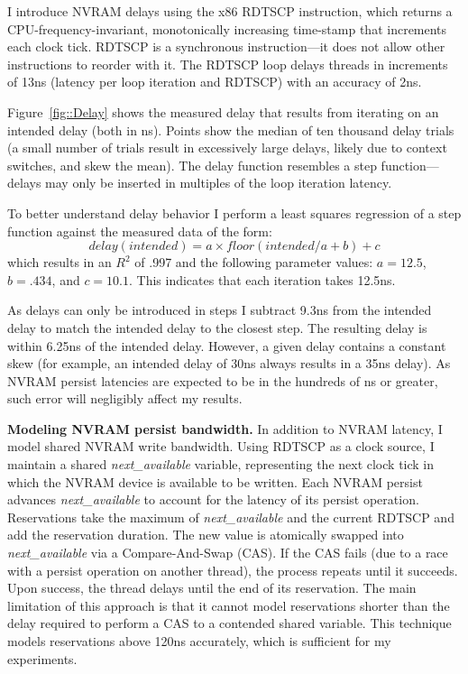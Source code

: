 I introduce NVRAM delays using the x86 RDTSCP instruction, which returns a CPU-frequency-invariant, monotonically increasing time-stamp that increments each clock tick.
RDTSCP is a synchronous instruction---it does not allow other instructions to reorder with it.
The RDTSCP loop delays threads in increments of 13ns (latency per loop iteration and RDTSCP) with an accuracy of 2ns.


Figure~\ref{fig::Delay} shows the measured delay that results from iterating on an intended delay (both in ns).
Points show the median of ten thousand delay trials (a small number of trials result in excessively large delays, likely due to context switches, and skew the mean).
The delay function resembles a step function---delays may only be inserted in multiples of the loop iteration latency.

To better understand delay behavior I perform a least squares regression of a step function against the measured data of the form:
$$delay(intended) = a \times floor(intended / a + b) + c$$
which results in an $R^2$ of .997 and the following parameter values: $a = 12.5$, $b=.434$, and $c=10.1$.
This indicates that each iteration takes 12.5ns.

As delays can only be introduced in steps I subtract 9.3ns from the intended delay to match the intended delay to the closest step.
The resulting delay is within 6.25ns of the intended delay.
However, a given delay contains a constant skew (for example, an intended delay of 30ns always results in a 35ns delay).
As NVRAM persist latencies are expected to be in the hundreds of ns or greater, such error will negligibly affect my results.

\textbf{Modeling NVRAM persist bandwidth.}
In addition to NVRAM latency, I model shared NVRAM write bandwidth.
Using RDTSCP as a clock source, I maintain a shared \emph{next\_available} variable, representing the next clock tick in which the NVRAM device is available to be written.
Each NVRAM persist advances \emph{next\_available} to account for the latency of its persist operation.
Reservations take the maximum of \emph{next\_available} and the current RDTSCP and add the reservation duration.
The new value is atomically swapped into \emph{next\_available} via a Compare-And-Swap (CAS).
If the CAS fails (due to a race with a persist operation on another thread), the process repeats until it succeeds.
Upon success, the thread delays until the end of its reservation.
The main limitation of this approach is that it cannot model reservations shorter than the delay required to perform a CAS to a contended shared variable.
This technique models reservations above 120ns accurately, which is sufficient for my experiments.

